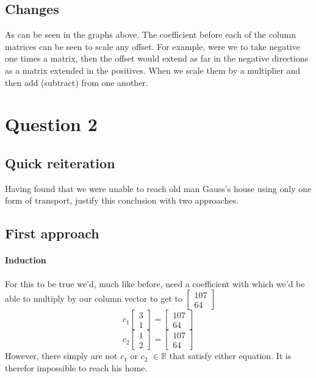 \documentclass{article}
\begin{document}
    \subsection{Changes}
    As can be seen in the graphs above. The coefficient before each of the column
    matrices can be seen to scale any offset. For example, were we to take negative
    one times a matrix, then the offset would extend as far in the negative directions
    as a matrix extended in the positives. When we scale them by a multiplier and then add
    (subtract) from one another.





\section{Question 2}
    \subsection{Quick reiteration}
    Having found that we were unable to reach old man Gauss's house using only
    one form of transport, justify this conclusion with two approaches.


    \subsection{First approach}
    \paragraph{Induction}
        For this to be true we'd, much like before, need a coefficient with which
        we'd be able to multiply by our column vector to get to $\begin{bmatrix}107 \\ 64\end{bmatrix}$
        \[{c_1}\begin{bmatrix}3 \\ 1\end{bmatrix} = \begin{bmatrix}107 \\ 64\end{bmatrix}\]
        \[{c_2}\begin{bmatrix}1 \\ 2\end{bmatrix} = \begin{bmatrix}107 \\ 64\end{bmatrix}\]
        However, there simply are not $c_1$ or $c_2$ $\in{\mathbb{R}}$ that satisfy either equation.
        It is therefor impossible to reach his home.
\end{document}
